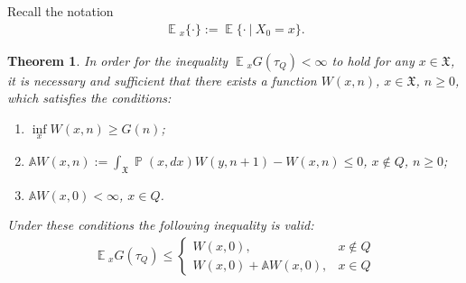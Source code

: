 \documentclass[10pt, reqno]{amsart}
\newtheorem*{theorem*}{Theorem}
\theoremstyle{definition}
\newcommand{\aasVar}{Q} %
\newcommand{\astVar}{\tau} %
\newcommand{\gtfVar}{G} %
\newcommand{\wtfVar}{W} %
\newcommand{\atoVar}{\mathbb{A}} %
\newcommand{\assVar}{\mathfrak{X}} %
\DeclareMathOperator*{\E}{\mathbb{E}}
\DeclareMathOperator*{\Pb}{\mathbb{P}}
\begin{document}
	Recall the notation
	\begin{gather}
		\E{}_{x}\{\cdot\} := \E\{\cdot \: | \: X_{0} = x\}.
	\end{gather}
	
	\begin{theorem*}
		In order for the inequality $\E{}_{x}\gtfVar(\astVar_{\aasVar}) < \infty$ to hold for any $x \in \assVar$, it is necessary and sufficient that there exists a function $\wtfVar(x, n)$, $x \in \assVar$, $n \geq 0$, which satisfies the conditions:
		\begin{enumerate}
			\item[(a)] $\underset{x}{\inf}\wtfVar(x, n) \geq \gtfVar(n)$;
			\item[(b)] $\atoVar\wtfVar(x, n) := \int_{\assVar}\Pb(x, dx)\wtfVar(y, n+1) - \wtfVar(x, n) \leq 0$, $x \notin \aasVar$, $n \geq 0$;
			\item[(c)] $\atoVar\wtfVar(x, 0) < \infty$, $x \in \aasVar$.
		\end{enumerate}
		Under these conditions the following inequality is valid:
		\begin{gather}
			\E{}_{x}\gtfVar(\astVar_{\aasVar}) \leq \begin{cases}
				\wtfVar(x, 0), & x \notin \aasVar \\
				\wtfVar(x, 0) + \atoVar\wtfVar(x, 0), & x \in \aasVar
			\end{cases}
			\label{main_G_W_inequality}
		\end{gather}
	\end{theorem*}
	
\end{document}
